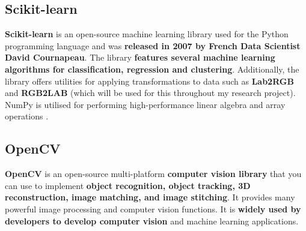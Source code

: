\subsection{Scikit-learn}
\textbf{Scikit-learn} is an open-source machine learning library used for the Python programming language and was \textbf{released in 2007 by French Data Scientist David Cournapeau}. The library \textbf{features several machine learning algorithms for classification, regression and clustering}. Additionally, the library offers utilities for applying transformations to data such as \textbf{Lab2RGB} and \textbf{RGB2LAB} (which will be used for this throughout my research project). NumPy is utilised for performing high-performance linear algebra and array operations \cite{enwiki:1065626908}.

\subsection{OpenCV}
\textbf{OpenCV} is an open-source multi-platform \textbf{computer vision library} that you can use to implement \textbf{object recognition, object tracking, 3D reconstruction, image matching, and image stitching}. It provides many powerful image processing and computer vision functions. It is \textbf{widely used by developers to develop computer vision} and machine learning applications\cite{enwiki:1072564905}.






